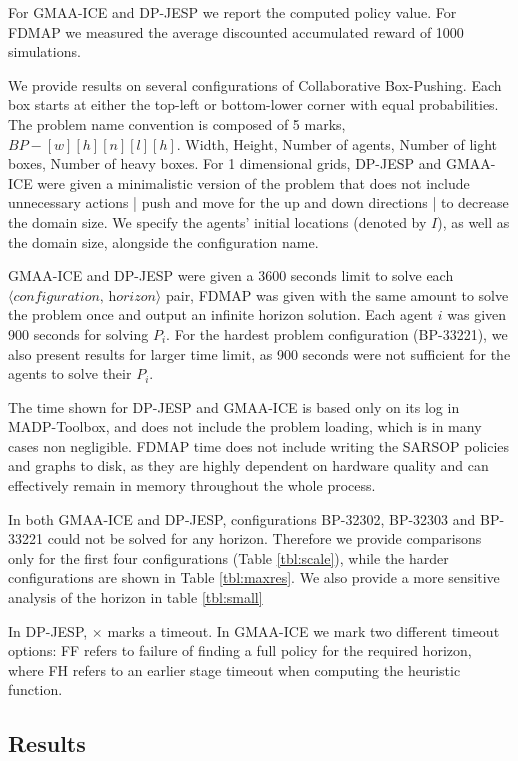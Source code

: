 \documentclass[letterpaper]{article} %
\theoremstyle{definition}
\newcommand{\cbp}[0]{Collaborative Box-Pushing}
\begin{document}
For GMAA-ICE and DP-JESP we report the computed policy value. For FDMAP we measured the average discounted accumulated reward of 1000 simulations.

We provide results on several configurations of \cbp. Each box starts at either the top-left or bottom-lower corner with equal probabilities. The problem name convention is composed of 5 marks, $\textit{BP}-[w][h][n][l][h]$.
Width, Height, Number of agents, Number of light boxes, Number of heavy boxes. For 1 dimensional grids, DP-JESP and GMAA-ICE were given a minimalistic version of the problem that does not include unnecessary actions | push and move for the up and down directions | to decrease the domain size. We specify the agents' initial locations (denoted by $I$), as well as the domain size, alongside the configuration name.

GMAA-ICE and DP-JESP were given a 3600 seconds limit to solve each $\langle\textit{configuration, horizon}\rangle$ pair, FDMAP was given with the same amount to solve the problem once and output an infinite horizon solution. Each agent $i$ was given 900 seconds for  solving $P_i$. For the hardest problem configuration (BP-33221), we also present results for larger time limit, as 900 seconds were not sufficient for the agents to solve their $P_i$.

The time shown for DP-JESP and GMAA-ICE is based only on its log in MADP-Toolbox, and does not include the problem loading, which is in many cases non negligible. FDMAP time does not include writing the SARSOP policies and graphs to disk, as they are highly dependent on hardware quality and can effectively remain in memory throughout the whole process.

In both GMAA-ICE and DP-JESP, configurations BP-32302, BP-32303 and BP-33221 could not be solved for any horizon. Therefore we provide comparisons only for the first four configurations (Table \ref{tbl:scale}), while the harder configurations are shown in Table \ref{tbl:maxres}. We also provide a more sensitive analysis of the horizon in table \ref{tbl:small}

In DP-JESP, $\times$ marks a timeout. In GMAA-ICE we mark two different timeout options: FF refers to failure of finding a full policy for the required horizon, where FH refers to an earlier stage timeout when computing the heuristic function.

\subsection{Results}
\end{document}
